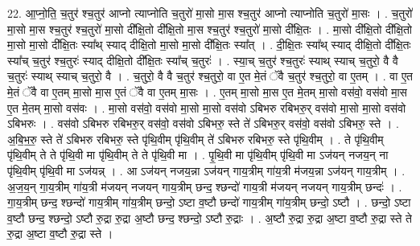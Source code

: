 \documentclass[17pt]{extarticle}
\begin{document}
22. आ॒प्नो॒ति॒ च॒तुर॑ श्च॒तुर॑ आप्नो त्याप्नोति च॒तुरो॑ मा॒सो मा॒स श्च॒तुर॑ आप्नो त्याप्नोति च॒तुरो॑ मा॒सः । . च॒तुरो॑ मा॒सो मा॒स श्च॒तुर॑ श्च॒तुरो॑ मा॒सो दी᳚क्षि॒तो दी᳚क्षि॒तो मा॒स श्च॒तुर॑ श्च॒तुरो॑ मा॒सो दी᳚क्षि॒तः । . मा॒सो दी᳚क्षि॒तो दी᳚क्षि॒तो मा॒सो मा॒सो दी᳚क्षि॒तः स्या᳚थ् स्याद् दीक्षि॒तो मा॒सो मा॒सो दी᳚क्षि॒तः स्या᳚त् । . दी॒क्षि॒तः स्या᳚थ् स्याद् दीक्षि॒तो दी᳚क्षि॒तः स्या᳚च् च॒तुर॑ श्च॒तुरः॑ स्याद् दीक्षि॒तो दी᳚क्षि॒तः स्या᳚च् च॒तुरः॑ । . स्या॒च् च॒तुर॑ श्च॒तुरः॑ स्याथ् स्याच् च॒तुरो॒ वै वै च॒तुरः॑ स्याथ् स्याच् च॒तुरो॒ वै । . च॒तुरो॒ वै वै च॒तुर॑ श्च॒तुरो॒ वा ए॒त मे॒तं ॅवै च॒तुर॑ श्च॒तुरो॒ वा ए॒तम् । . वा ए॒त मे॒तं ॅवै वा ए॒तम् मा॒सो मा॒स ए॒तं ॅवै वा ए॒तम् मा॒सः । . ए॒तम् मा॒सो मा॒स ए॒त मे॒तम् मा॒सो वस॑वो॒ वस॑वो मा॒स ए॒त मे॒तम् मा॒सो वस॑वः । . मा॒सो वस॑वो॒ वस॑वो मा॒सो मा॒सो वस॑वो ऽबिभरु रबिभरु॒र् वस॑वो मा॒सो मा॒सो वस॑वो ऽबिभरुः । . वस॑वो ऽबिभरु रबिभरु॒र् वस॑वो॒ वस॑वो ऽबिभरु॒ स्ते ते॑ ऽबिभरु॒र् वस॑वो॒ वस॑वो ऽबिभरु॒ स्ते । . अ॒बि॒भ॒रु॒ स्ते ते॑ ऽबिभरु रबिभरु॒ स्ते पृ॑थि॒वीम् पृ॑थि॒वीम् ते॑ ऽबिभरु रबिभरु॒ स्ते पृ॑थि॒वीम् । . ते पृ॑थि॒वीम् पृ॑थि॒वीम् ते ते पृ॑थि॒वी मा पृ॑थि॒वीम् ते ते पृ॑थि॒वी मा । . पृ॒थि॒वी मा पृ॑थि॒वीम् पृ॑थि॒वी मा ऽज॑यन् नजय॒न् ना पृ॑थि॒वीम् पृ॑थि॒वी मा ऽज॑यन्न् । . आ ऽज॑यन् नजय॒न्ना ऽज॑यन् गाय॒त्रीम् गा॑य॒त्री म॑जय॒न्ना ऽज॑यन् गाय॒त्रीम् । . अ॒ज॒य॒न् गा॒य॒त्रीम् गा॑य॒त्री म॑जयन् नजयन् गाय॒त्रीम् छन्द॒ श्छन्दो॑ गाय॒त्री म॑जयन् नजयन् गाय॒त्रीम् छन्दः॑ । . गा॒य॒त्रीम् छन्द॒ श्छन्दो॑ गाय॒त्रीम् गा॑य॒त्रीम् छन्दो॒ ऽष्टा व॒ष्टौ छन्दो॑ गाय॒त्रीम् गा॑य॒त्रीम् छन्दो॒ ऽष्टौ । . छन्दो॒ ऽष्टा व॒ष्टौ छन्द॒ श्छन्दो॒ ऽष्टौ रु॒द्रा रु॒द्रा अ॒ष्टौ छन्द॒ श्छन्दो॒ ऽष्टौ रु॒द्राः । . अ॒ष्टौ रु॒द्रा रु॒द्रा अ॒ष्टा व॒ष्टौ रु॒द्रा स्ते ते रु॒द्रा अ॒ष्टा व॒ष्टौ रु॒द्रा स्ते । \newline
\end{document}
